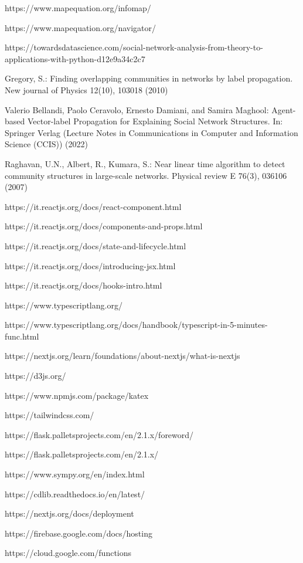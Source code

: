 \documentclass[a4paper,12pt]{report}
\begin{document}
%
%
\begin{thebibliography}{0}
%
https://www.mapequation.org/infomap/

https://www.mapequation.org/navigator/

https://towardsdatascience.com/social-network-analysis-from-theory-to-applications-with-python-d12e9a34c2c7

Gregory, S.: Finding overlapping communities in networks by label propagation.
New journal of Physics 12(10), 103018 (2010)

Valerio Bellandi, Paolo Ceravolo, Ernesto Damiani, and Samira Maghool: Agent-based Vector-label Propagation for Explaining Social Network Structures. In: Springer Verlag (Lecture Notes in Communications in Computer and Information Science (CCIS)) (2022)

Raghavan, U.N., Albert, R., Kumara, S.: Near linear time algorithm to detect
community structures in large-scale networks. Physical review E 76(3), 036106
(2007)

https://it.reactjs.org/docs/react-component.html

https://it.reactjs.org/docs/components-and-props.html

https://it.reactjs.org/docs/state-and-lifecycle.html

https://it.reactjs.org/docs/introducing-jsx.html

https://it.reactjs.org/docs/hooks-intro.html

https://www.typescriptlang.org/

https://www.typescriptlang.org/docs/handbook/typescript-in-5-minutes-func.html

https://nextjs.org/learn/foundations/about-nextjs/what-is-nextjs

https://d3js.org/

https://www.npmjs.com/package/katex

https://tailwindcss.com/

https://flask.palletsprojects.com/en/2.1.x/foreword/

https://flask.palletsprojects.com/en/2.1.x/

https://www.sympy.org/en/index.html

https://cdlib.readthedocs.io/en/latest/

https://nextjs.org/docs/deployment

https://firebase.google.com/docs/hosting

https://cloud.google.com/functions
%
\end{thebibliography}
% 
\end{document}
